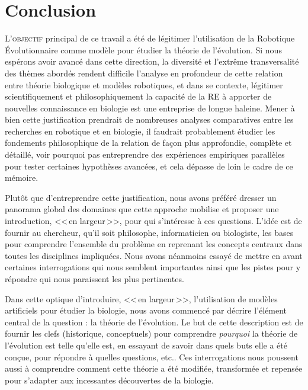 
\chapter*{Conclusion}

\lettrine[lines=2]{L}{'objectif} principal de ce travail a été de légitimer l'utilisation de la Robotique \'Evolutionnaire comme modèle pour étudier la théorie de l'évolution. Si nous espérons avoir avancé dans cette direction, la diversité et l'extrême transversalité des thèmes abordés rendent difficile l'analyse en profondeur de cette relation entre théorie biologique et modèles robotiques, et dans se contexte, légitimer scientifiquement et philosophiquement la capacité de la RE à apporter de nouvelles connaissance en biologie est une entreprise de longue haleine. Mener à bien cette justification prendrait de nombreuses analyses comparatives entre les recherches en robotique et en biologie, il faudrait probablement étudier les fondements philosophique de la relation de façon plus approfondie, complète et détaillé, voir pourquoi pas entreprendre des expériences empiriques parallèles pour tester certaines hypothèses avancées, et cela dépasse de loin le cadre de ce mémoire. 

Plutôt que d'entreprendre cette justification, nous avons préféré dresser un panorama global des domaines que cette approche mobilise et proposer une introduction, <<\,en largeur\,>>, pour qui s'intéresse à ces questions. L'idée est de fournir au chercheur, qu'il soit philosophe, informaticien ou biologiste, les bases pour comprendre l'ensemble du problème en reprenant les concepts centraux dans toutes les disciplines impliquées. Nous avons néanmoins essayé de mettre en avant certaines interrogations qui nous semblent importantes ainsi que les pistes pour y répondre qui nous paraissent les plus pertinentes.

Dans cette optique d'introduire, <<\,en largeur\,>>, l'utilisation de modèles artificiels pour étudier la biologie, nous avons commencé par décrire l'élément central de la question : la théorie de l'évolution. Le but de cette description est de fournir les clefs (historique, conceptuels) pour comprendre \emph{pourquoi} la théorie de l'évolution est telle qu'elle est, en essayant de savoir dans quels buts elle a été conçue, pour répondre à quelles questions, etc.. Ces interrogations nous poussent aussi à comprendre comment cette théorie a été modifiée, transformée et repensée pour s'adapter aux incessantes découvertes de la biologie.  

